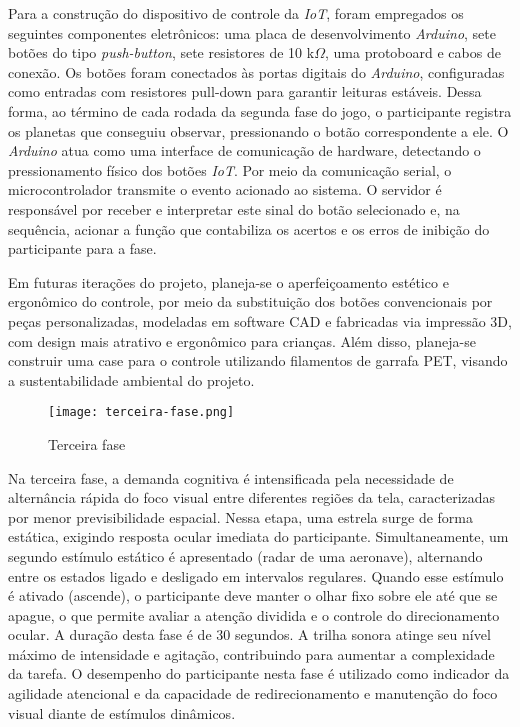 Para a construção do dispositivo de controle da \textit{IoT}, foram empregados os seguintes componentes eletrônicos: uma placa de desenvolvimento \textit{Arduino}, sete botões do tipo \textit{push-button}, sete resistores de 10 k$\Omega$, uma protoboard e cabos de conexão. Os botões foram conectados às portas digitais do \textit{Arduino}, configuradas como entradas com resistores pull-down para garantir leituras estáveis. Dessa forma, ao término de cada rodada da segunda fase do jogo, o participante registra os planetas que conseguiu observar, pressionando o botão correspondente a ele. O \textit{Arduino} atua como uma interface de comunicação de hardware, detectando o pressionamento físico dos botões \textit{IoT}. Por meio da comunicação serial, o microcontrolador transmite o evento acionado ao sistema. O servidor é responsável por receber e interpretar este sinal do botão selecionado e, na sequência, acionar a função que contabiliza os acertos e os erros de inibição do participante para a fase.

Em futuras iterações do projeto, planeja-se o aperfeiçoamento estético e ergonômico do controle, por meio da substituição dos botões convencionais por peças personalizadas, modeladas em software CAD e fabricadas via impressão 3D, com design mais atrativo e ergonômico para crianças. Além disso, planeja-se construir uma case para o controle utilizando filamentos de garrafa PET, visando a sustentabilidade ambiental do projeto.

\begin{figure}[H]
    \centering
    \caption{Terceira fase}%
    \label{fig:terceira-fase}
    \texttt{[image: terceira-fase.png]}%
\end{figure}

Na terceira fase, a demanda cognitiva é intensificada pela necessidade de alternância rápida do foco visual entre diferentes regiões da tela, caracterizadas por menor previsibilidade espacial. Nessa etapa, uma estrela surge de forma estática, exigindo resposta ocular imediata do participante. Simultaneamente, um segundo estímulo estático é apresentado (radar de uma aeronave), alternando entre os estados ligado e desligado em intervalos regulares. Quando esse estímulo é ativado (ascende), o participante deve manter o olhar fixo sobre ele até que se apague, o que permite avaliar a atenção dividida e o controle do direcionamento ocular. A duração desta fase é de 30 segundos. A trilha sonora atinge seu nível máximo de intensidade e agitação, contribuindo para aumentar a complexidade da tarefa. O desempenho do participante nesta fase é utilizado como indicador da agilidade atencional e da capacidade de redirecionamento e manutenção do foco visual diante de estímulos dinâmicos.

